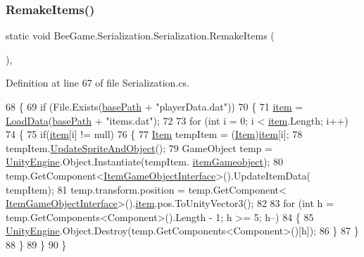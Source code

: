 \subsubsection{\texorpdfstring{Remake\+Items()}{RemakeItems()}}
{\footnotesize\ttfamily static void Bee\+Game.\+Serialization.\+Serialization.\+Remake\+Items (\begin{DoxyParamCaption}{ }\end{DoxyParamCaption})\hspace{0.3cm}{\ttfamily [static]}, {\ttfamily [private]}}



Definition at line 67 of file Serialization.\+cs.


\begin{DoxyCode}
68         \{
69             \textcolor{keywordflow}{if} (File.Exists(\hyperlink{class_bee_game_1_1_serialization_1_1_serialization_ab90922fcf58a723ce591487507356310}{basePath} + \textcolor{stringliteral}{"playerData.dat"}))
70             \{
71                 \hyperlink{class_bee_game_1_1_serialization_1_1_serialization_af3359d6ca7e84c9e52a790beb1cc502e}{item} = \hyperlink{class_bee_game_1_1_serialization_1_1_serialization_a733a85a3fd7cb1194269464a71926959}{LoadData}(\hyperlink{class_bee_game_1_1_serialization_1_1_serialization_ab90922fcf58a723ce591487507356310}{basePath} + \textcolor{stringliteral}{"items.dat"});
72 
73                 \textcolor{keywordflow}{for} (\textcolor{keywordtype}{int} i = 0; i < \hyperlink{class_bee_game_1_1_serialization_1_1_serialization_af3359d6ca7e84c9e52a790beb1cc502e}{item}.Length; i++)
74                 \{
75                     \textcolor{keywordflow}{if}(\hyperlink{class_bee_game_1_1_serialization_1_1_serialization_af3359d6ca7e84c9e52a790beb1cc502e}{item}[i] != null)
76                     \{
77                         \hyperlink{struct_bee_game_1_1_items_1_1_item}{Item} tempItem = (\hyperlink{struct_bee_game_1_1_items_1_1_item}{Item})\hyperlink{class_bee_game_1_1_serialization_1_1_serialization_af3359d6ca7e84c9e52a790beb1cc502e}{item}[i];
78                         tempItem.\hyperlink{struct_bee_game_1_1_items_1_1_item_a29abdb5010a23262e7562720bb85c171}{UpdateSpriteAndObject}();
79                         GameObject temp = \hyperlink{namespace_unity_engine}{UnityEngine}.Object.Instantiate(tempItem.
      \hyperlink{struct_bee_game_1_1_items_1_1_item_af28a8cd4a0eff9d4c18189c5ab525f18}{itemGameobject});
80                         temp.GetComponent<\hyperlink{class_bee_game_1_1_items_1_1_item_game_object_interface}{ItemGameObjectInterface}>().UpdateItemData(
      tempItem);
81                         temp.transform.position = temp.GetComponent<
      \hyperlink{class_bee_game_1_1_items_1_1_item_game_object_interface}{ItemGameObjectInterface}>().\hyperlink{class_bee_game_1_1_serialization_1_1_serialization_af3359d6ca7e84c9e52a790beb1cc502e}{item}.pos.ToUnityVector3();
82 
83                         \textcolor{keywordflow}{for} (\textcolor{keywordtype}{int} h = temp.GetComponents<Component>().Length - 1; h >= 5; h--)
84                         \{
85                             \hyperlink{namespace_unity_engine}{UnityEngine}.Object.Destroy(temp.GetComponents<Component>()[h]);
86                         \}
87                     \}
88                 \}
89             \}
90         \}
\end{DoxyCode}
